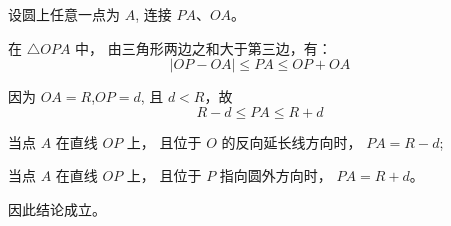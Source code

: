 \begin{proofbox}
设圆上任意一点为 $A$,
连接 $PA$、$OA$。

在 $\triangle OPA$ 中，
由三角形两边之和大于第三边，有：
\[
|OP-OA| \le PA \le OP+OA
\]

因为 $OA=R$,$OP=d$,
且 $d<R$，故
\[
R-d \le PA \le R+d
\]

当点 $A$ 在直线 $OP$ 上，
且位于 $O$ 的反向延长线方向时，
$PA=R-d$;

当点 $A$ 在直线 $OP$ 上，
且位于 $P$ 指向圆外方向时，
$PA=R+d$。

因此结论成立。
\end{proofbox}
